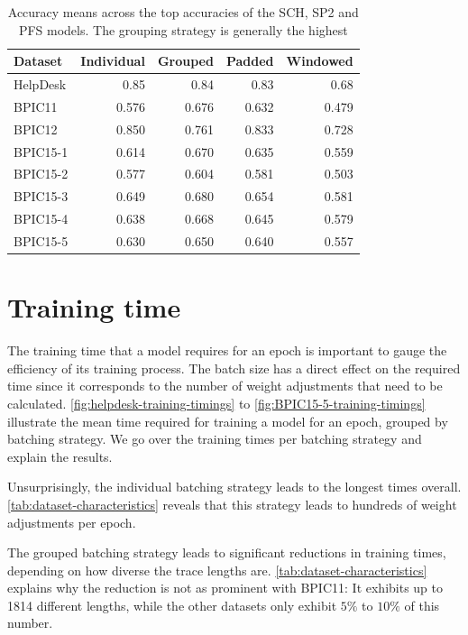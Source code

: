 \begin{table}
\centering
\begin{tabular}{l|rrrr}
Dataset  &  Individual &   Grouped &    Padded &  Windowed \\
\midrule
HelpDesk &    0.85     &  0.84     &  0.83     &  0.68     \\
BPIC11   &    0.576    &  0.676    &  0.632    &  0.479    \\
BPIC12   &    0.850    &  0.761    &  0.833    &  0.728    \\
BPIC15-1 &    0.614    &  0.670    &  0.635    &  0.559    \\
BPIC15-2 &    0.577    &  0.604    &  0.581    &  0.503    \\
BPIC15-3 &    0.649    &  0.680    &  0.654    &  0.581    \\
BPIC15-4 &    0.638    &  0.668    &  0.645    &  0.579    \\
BPIC15-5 &    0.630    &  0.650    &  0.640    &  0.557    \\
\end{tabular}
\caption[Grouping strategy leads to best mean accuracies]{Accuracy means across the top accuracies of the SCH, SP2 and PFS models. The grouping strategy is generally the highest}
\label{tab:strategy-top-accuracies}
\end{table}
\FloatBarrier

\section{Training time}\label{sec:eval:training-time}
The training time that a model requires for an epoch is important to gauge the efficiency of its training process. The batch size has a direct effect on the required time since it corresponds to the number of weight adjustments that need to be calculated. \autoref{fig:helpdesk-training-timings} to \autoref{fig:BPIC15-5-training-timings} illustrate the mean time required for training a model for an epoch, grouped by batching strategy. We go over the training times per batching strategy and explain the results.

Unsurprisingly, the individual batching strategy leads to the longest times overall. \autoref{tab:dataset-characteristics} reveals that this strategy leads to hundreds of weight adjustments per epoch.

The grouped batching strategy leads to significant reductions in training times, depending on how diverse the trace lengths are. \autoref{tab:dataset-characteristics} explains why the reduction is not as prominent with BPIC11: It exhibits up to 1814 different lengths, while the other datasets only exhibit $5\%$ to $10\%$ of this number.

